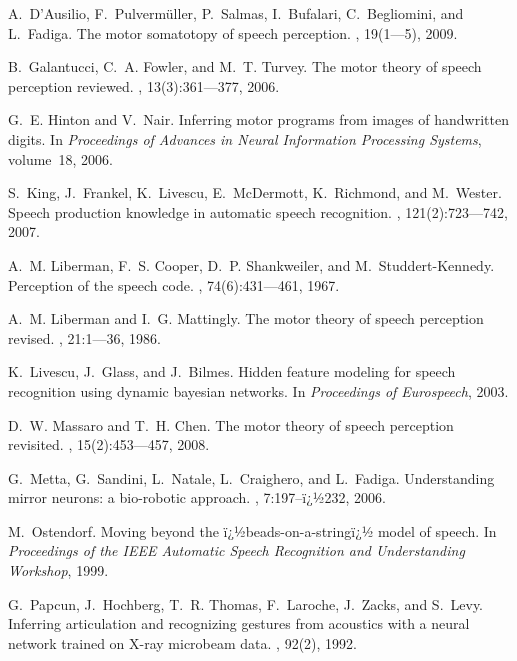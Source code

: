 \documentclass{pnastwo}
\begin{document}
\begin{article}
\begin{thebibliography}{99}
A.~D'Ausilio, F.~Pulverm\"uller, P.~Salmas, I.~Bufalari, C.~Begliomini, and
  L.~Fadiga.
\newblock The motor somatotopy of speech perception.
, 19(1---5), 2009.

B.~Galantucci, C.~A. Fowler, and M.~T. Turvey.
\newblock The motor theory of speech perception reviewed.
, 13(3):361---377, 2006.

G.~E. Hinton and V.~Nair.
\newblock Inferring motor programs from images of handwritten digits.
\newblock In {\em Proceedings of Advances in Neural Information Processing
  Systems}, volume~18, 2006.

S.~King, J.~Frankel, K.~Livescu, E.~McDermott, K.~Richmond, and M.~Wester.
\newblock Speech production knowledge in automatic speech recognition.
, 121(2):723---742,
  2007.

A.~M. Liberman, F.~S. Cooper, D.~P. Shankweiler, and M.~{Studdert-Kennedy}.
\newblock Perception of the speech code.
, 74(6):431---461, 1967.

A.~M. Liberman and I.~G. Mattingly.
\newblock The motor theory of speech perception revised.
, 21:1---36, 1986.

K.~Livescu, J.~Glass, and J.~Bilmes.
\newblock Hidden feature modeling for speech recognition using dynamic bayesian
  networks.
\newblock In {\em Proceedings of Eurospeech}, 2003.

D.~W. Massaro and T.~H. Chen.
\newblock The motor theory of speech perception revisited.
, 15(2):453---457, 2008.

G.~Metta, G.~Sandini, L.~Natale, L.~Craighero, and L.~Fadiga.
\newblock Understanding mirror neurons: a bio-robotic approach.
, 7:197--ï¿½232, 2006.

M.~Ostendorf.
\newblock Moving beyond the {ï¿½beads-on-a-stringï¿½} model of speech.
\newblock In {\em Proceedings of the IEEE Automatic Speech Recognition and
  Understanding Workshop}, 1999.

G.~Papcun, J.~Hochberg, T.~R. Thomas, F.~Laroche, J.~Zacks, and S.~Levy.
\newblock Inferring articulation and recognizing gestures from acoustics with a
  neural network trained on {X}-ray microbeam data.
, 92(2), 1992.


\end{thebibliography}
\end{article}
\end{document}
